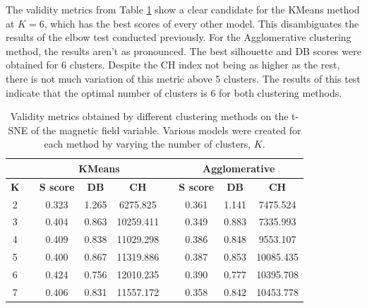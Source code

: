 The validity metrics from Table \ref{tab:tsne_b} show a clear candidate for the KMeans method at $K=6$, which has the best scores of every other model. This disambiguates the results of the elbow test conducted previously. For the Agglomerative clustering method, the results aren't as pronounced. The best silhouette and DB scores were obtained for 6 clusters. Despite the CH index not being as higher as the rest, there is not much variation of this metric above 5 clusters. The results of this test indicate that the optimal number of clusters is 6 for both clustering methods.

\begin{table}[]
\caption[Validity metrics for t-SNE of the Magnetic Field]{Validity metrics obtained by different clustering methods on the t-SNE of the magnetic field variable. Various models were created for each method by varying the number of clusters, $K$.}\label{tab:tsne_b}
\begin{tabular}{@{}ccccccccc@{}}
\toprule
\multicolumn{1}{l}{} & \multicolumn{1}{l}{} & \multicolumn{3}{c}{\textbf{KMeans}}          & \multicolumn{1}{l}{} & \multicolumn{3}{c}{\textbf{Agglomerative}}   \\ \midrule
\textbf{K}           & \textbf{}            & \textbf{S score} & \textbf{DB} & \textbf{CH} & \textbf{}            & \textbf{S score} & \textbf{DB} & \textbf{CH} \\ \midrule
2                    &                      & 0.323            & 1.265       & 6275.825    &                      & 0.361            & 1.141       & 7475.524    \\
3                    &                      & 0.404            & 0.863       & 10259.411   &                      & 0.349            & 0.883       & 7335.993    \\
4                    &                      & 0.409            & 0.838       & 11029.298   &                      & 0.386            & 0.848       & 9553.107    \\
5                    &                      & 0.400            & 0.867       & 11319.886   &                      & 0.387            & 0.853       & 10085.435   \\
6                    &                      & 0.424            & 0.756       & 12010.235   &                      & 0.390            & 0.777       & 10395.708   \\
7                    &                      & 0.406            & 0.831       & 11557.172   &                      & 0.358            & 0.842       & 10453.778   \\

\end{tabular}
\end{table}
